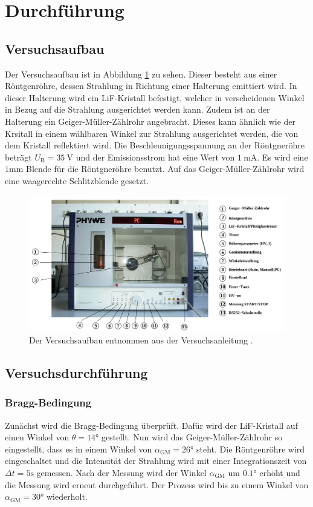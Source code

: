 \section{Durchführung}
\label{sec:Durchführung}

\subsection{Versuchsaufbau}
\label{sec:aufbau}
Der Versuchsaufbau ist in Abbildung \ref{fig:roehre} zu sehen.
Dieser besteht aus einer Röntgenröhre, dessen Strahlung in Richtung einer Halterung emittiert wird.
In dieser Halterung wird ein LiF-Kristall befestigt, welcher in verscheidenen Winkel in Bezug auf die Strahlung ausgerichtet werden kann.
Zudem ist an der Halterung ein Geiger-Müller-Zählrohr angebracht.
Dieses kann ähnlich wie der Krsitall in einem wählbaren Winkel zur Strahlung ausgerichtet werden, die von dem Kristall reflektiert wird.
Die Beschleunigungsspannung an der Röntgneröhre beträgt $U_\text{B} = \SI{35}{\volt}$ und der Emissionsstrom hat eine  Wert von $\SI{1}{\milli\ampere}$.
Es wird eine $1\si{\milli\meter}$ Blende für die Röntgneröhre benutzt.
Auf das Geiger-Müller-Zählrohr wird eine waagerechte Schlitzblende gesetzt.
\begin{figure}
    \centering
    \includegraphics[width=\textwidth]{content/data/Roehre.png}
    \caption{Der Versuchsaufbau entnommen aus der Versuchsanleitung \cite{anleitung}.}
    \label{fig:roehre}
\end{figure}


\subsection{Versuchsdurchführung}
\subsubsection{Bragg-Bedingung}
\label{sec:bragg}
Zunächst wird die Bragg-Bedingung überprüft.
Dafür wird der LiF-Kristall auf einen Winkel von $\theta = 14\si{\degree}$ gestellt.
Nun wird das Geiger-Müller-Zählrohr so eingestellt, dass es in einem Winkel von $\alpha_\text{GM} = 26 \si{\degree}$ steht.
Die Röntgenröhre wird eingeschaltet und die Intensität der Strahlung wird mit einer Integrationszeit von $\Delta t = 5 \si{\second}$ gemessen.
Nach der Messung wird der Winkel $\alpha_\text{GM}$ um $0.1\si{\degree}$ erhöht und die Messung wird erneut durchgeführt.
Der Prozess wird bis zu einem Winkel von $\alpha_\text{GM} = 30\si{\degree}$ wiederholt.


